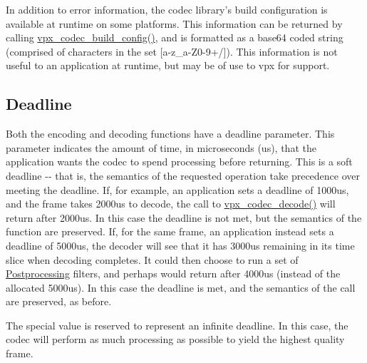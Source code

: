 \-In addition to error information, the codec library's build configuration is available at runtime on some platforms. \-This information can be returned by calling \hyperlink{group__codec_ga20922bad85472e76d5f61c21cb423af7}{vpx\-\_\-codec\-\_\-build\-\_\-config()}, and is formatted as a base64 coded string (comprised of characters in the set \mbox{[}a-\/z\-\_\-a-\/\-Z0-\/9+/\mbox{]}). \-This information is not useful to an application at runtime, but may be of use to vpx for support.\hypertarget{usage_usage_deadline}{}\subsection{\-Deadline}\label{usage_usage_deadline}
\-Both the encoding and decoding functions have a {\ttfamily deadline} parameter. \-This parameter indicates the amount of time, in microseconds (us), that the application wants the codec to spend processing before returning. \-This is a soft deadline -\/-\/ that is, the semantics of the requested operation take precedence over meeting the deadline. \-If, for example, an application sets a {\ttfamily deadline} of 1000us, and the frame takes 2000us to decode, the call to \hyperlink{group__decoder_ga3441e157a7a69108bca9a069f2ee8e0d}{vpx\-\_\-codec\-\_\-decode()} will return after 2000us. \-In this case the deadline is not met, but the semantics of the function are preserved. \-If, for the same frame, an application instead sets a {\ttfamily deadline} of 5000us, the decoder will see that it has 3000us remaining in its time slice when decoding completes. \-It could then choose to run a set of \hyperlink{usage_decode_usage_postproc}{\-Postprocessing} filters, and perhaps would return after 4000us (instead of the allocated 5000us). \-In this case the deadline is met, and the semantics of the call are preserved, as before.

\-The special value {} is reserved to represent an infinite deadline. \-In this case, the codec will perform as much processing as possible to yield the highest quality frame.

